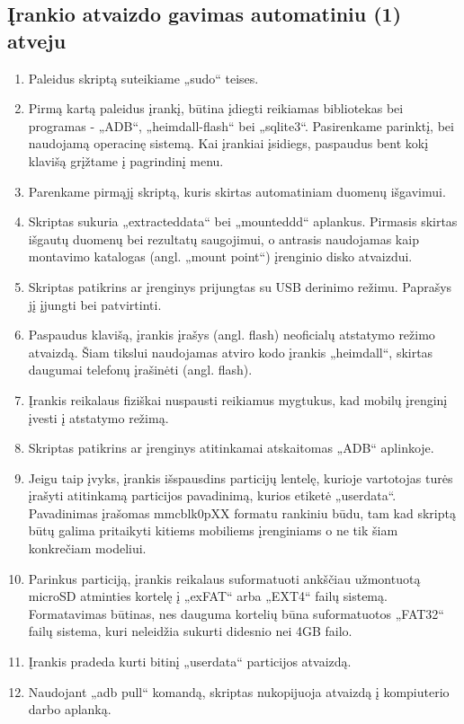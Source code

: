 \documentclass[a4paper,12pt,fleqn]{article}
\begin{document}
\subsection{Įrankio atvaizdo gavimas automatiniu (1) atveju}    
\begin{enumerate}
    \item Paleidus skriptą suteikiame „sudo“ teises.
    \item Pirmą kartą paleidus įrankį, būtina įdiegti reikiamas bibliotekas bei programas - „ADB“, „heimdall-flash“ bei „sqlite3“. Pasirenkame parinktį, bei naudojamą operacinę sistemą. Kai įrankiai įsidiegs, paspaudus bent kokį klavišą grįžtame į pagrindinį menu.
    \item Parenkame pirmąjį skriptą, kuris skirtas automatiniam duomenų išgavimui.
    \item Skriptas sukuria „extracted\textunderscore data“ bei „mounted\textunderscore dd“ aplankus. Pirmasis skirtas išgautų duomenų bei rezultatų saugojimui, o antrasis naudojamas kaip montavimo katalogas (angl. „mount point“) įrenginio disko atvaizdui.
    \item Skriptas patikrins ar įrenginys prijungtas su USB derinimo režimu. Paprašys jį įjungti bei patvirtinti.
    \item  Paspaudus klavišą, įrankis įrašys (angl. flash) neoficialų atstatymo režimo atvaizdą. Šiam tikslui naudojamas atviro kodo įrankis „heimdall“, skirtas daugumai telefonų įrašinėti (angl. flash).
    \item Įrankis reikalaus fiziškai nuspausti reikiamus mygtukus, kad mobilų įrenginį įvesti į atstatymo režimą.
    \item  Skriptas patikrins ar įrenginys atitinkamai atskaitomas „ADB“ aplinkoje.
    \item Jeigu taip įvyks, įrankis išspausdins particijų lentelę, kurioje vartotojas turės įrašyti atitinkamą particijos pavadinimą, kurios etiketė „userdata“. Pavadinimas įrašomas mmcblk0pXX formatu rankiniu būdu, tam kad skriptą būtų galima pritaikyti kitiems mobiliems įrenginiams o ne tik šiam konkrečiam modeliui.
    \item Parinkus particiją, įrankis reikalaus suformatuoti ankščiau užmontuotą microSD atminties kortelę į „exFAT“ arba „EXT4“ failų sistemą. Formatavimas būtinas, nes dauguma kortelių būna suformatuotos „FAT32“ failų sistema, kuri neleidžia sukurti didesnio nei 4GB failo.
    \item Įrankis pradeda kurti bitinį „userdata“ particijos atvaizdą. 
    \item Naudojant „adb pull“ komandą, skriptas nukopijuoja atvaizdą į kompiuterio darbo aplanką.

\end{enumerate}
\end{document}
